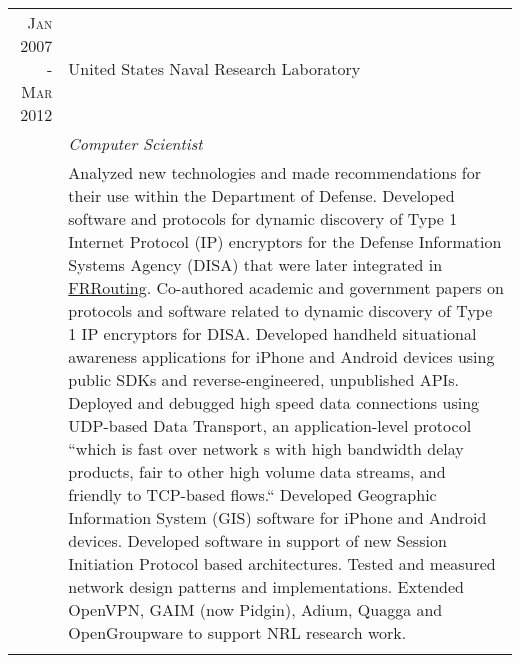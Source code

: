 \documentclass[a4paper,10pt]{article} %
\begin{document}
\begin{tabular}{r|p{11cm}}
\textsc{Jan 2007 - Mar 2012} & United States Naval Research Laboratory\\
& \emph{Computer Scientist} \\
& \footnotesize{Analyzed new technologies and made recommendations for their use within the Department of Defense. Developed software and protocols for dynamic discovery of Type 1 Internet Protocol (IP) encryptors for the Defense Information Systems Agency (DISA) that were later integrated in \href{https://frrouting.org/}{FRRouting}. Co-authored academic and government papers on protocols and software related to dynamic discovery of Type 1 IP encryptors for DISA. Developed handheld situational awareness applications for iPhone and Android devices using public SDKs and reverse-engineered, unpublished APIs. Deployed and debugged high speed data connections using UDP-based Data Transport, an application-level protocol ``which is fast over network
s with high bandwidth delay products, fair to other high volume data streams, and friendly to TCP-based flows.`` Developed Geographic Information System (GIS) software for iPhone and Android devices. Developed software in support of new Session Initiation Protocol based architectures. Tested and measured network design patterns and implementations. Extended OpenVPN, GAIM (now Pidgin), Adium, Quagga and OpenGroupware to support NRL research work.}\\
\multicolumn{2}{c}{} \\

\end{tabular}


\nocite{*}

\end{document}
